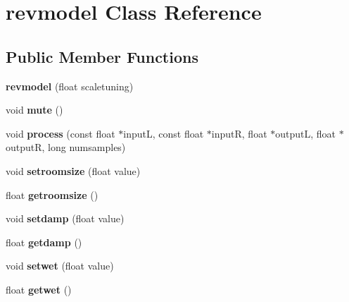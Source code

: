 \hypertarget{classrevmodel}{\section{revmodel Class Reference}
\label{classrevmodel}
}
\subsection*{Public Member Functions}
\begin{DoxyCompactItemize}
\item 
\hypertarget{classrevmodel_a5099c37cdf640c94ea87d1205396b230}{{\bfseries revmodel} (float scaletuning)}\label{classrevmodel_a5099c37cdf640c94ea87d1205396b230}

\item 
\hypertarget{classrevmodel_a57c4aad6531c32e11691dfbe013bdad9}{void {\bfseries mute} ()}\label{classrevmodel_a57c4aad6531c32e11691dfbe013bdad9}

\item 
\hypertarget{classrevmodel_ab4a1cbe3c48b99170b3a745be87e3c2a}{void {\bfseries process} (const float $\ast$input\-L, const float $\ast$input\-R, float $\ast$output\-L, float $\ast$output\-R, long numsamples)}\label{classrevmodel_ab4a1cbe3c48b99170b3a745be87e3c2a}

\item 
\hypertarget{classrevmodel_ad71a81765b983ac99a30dbdfa4778659}{void {\bfseries setroomsize} (float value)}\label{classrevmodel_ad71a81765b983ac99a30dbdfa4778659}

\item 
\hypertarget{classrevmodel_a196043f0bd588a738a8065d186f48a74}{float {\bfseries getroomsize} ()}\label{classrevmodel_a196043f0bd588a738a8065d186f48a74}

\item 
\hypertarget{classrevmodel_ada99d1c19685dfe7178281c8c65d4598}{void {\bfseries setdamp} (float value)}\label{classrevmodel_ada99d1c19685dfe7178281c8c65d4598}

\item 
\hypertarget{classrevmodel_aac6ef7e868803b080337728be8180566}{float {\bfseries getdamp} ()}\label{classrevmodel_aac6ef7e868803b080337728be8180566}

\item 
\hypertarget{classrevmodel_a544c0619d72af6d21f6f244cc89cfc6e}{void {\bfseries setwet} (float value)}\label{classrevmodel_a544c0619d72af6d21f6f244cc89cfc6e}

\item 
\hypertarget{classrevmodel_ae9033d82fb3a58529b35110160b1f4e8}{float {\bfseries getwet} ()}\label{classrevmodel_ae9033d82fb3a58529b35110160b1f4e8}


\end{DoxyCompactItemize}
